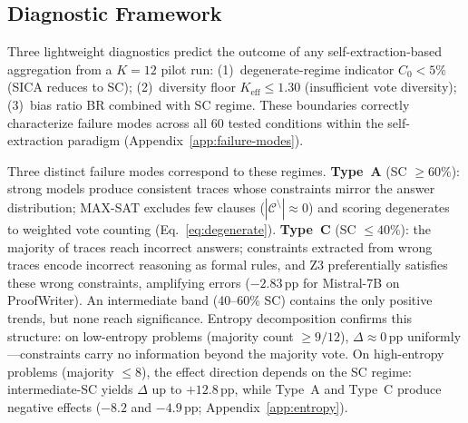 \begin{table}[t]
\centering
\small
\caption{Cross-generator NLI escape with DeBERTa-large-mnli verifier (55.00\% standalone, ProofWriter $n{=}600$). Combo (SC + NLI ensemble) gain decreases monotonically with generator capability.}
\label{tab:cross_generator_nli}
\end{table}

\subsection{Diagnostic Framework}
\label{sec:diagnostic-framework}
\label{sec:diagnostics}

 Three lightweight diagnostics predict the outcome of any self-extraction-based aggregation from a $K{=}12$ pilot run: (1)~degenerate-regime indicator $C_0 < 5\%$ (SICA reduces to SC); (2)~diversity floor $K_\text{eff} \leq 1.30$ (insufficient vote diversity); (3)~bias ratio BR combined with SC regime. These boundaries correctly characterize failure modes across all 60 tested conditions within the self-extraction paradigm (Appendix~\ref{app:failure-modes}).

 Three distinct failure modes correspond to these regimes. \textbf{Type~A} (SC $\geq 60\%$): strong models produce consistent traces whose constraints mirror the answer distribution; MAX-SAT excludes few clauses ($|\mathcal{C}^{\setminus}| \approx 0$) and scoring degenerates to weighted vote counting (Eq.~\ref{eq:degenerate}). \textbf{Type~C} (SC $\leq 40\%$): the majority of traces reach incorrect answers; constraints extracted from wrong traces encode incorrect reasoning as formal rules, and Z3 preferentially satisfies these wrong constraints, amplifying errors ($-2.83$\,pp for Mistral-7B on ProofWriter). An intermediate band (40--60\% SC) contains the only positive trends, but none reach significance. Entropy decomposition confirms this structure: on low-entropy problems (majority count $\geq 9/12$), $\Delta \approx 0$\,pp uniformly---constraints carry no information beyond the majority vote. On high-entropy problems (majority $\leq 8$), the effect direction depends on the SC regime: intermediate-SC yields $\Delta$ up to $+12.8$\,pp, while Type~A and Type~C produce negative effects ($-8.2$ and $-4.9$\,pp; Appendix~\ref{app:entropy}).

